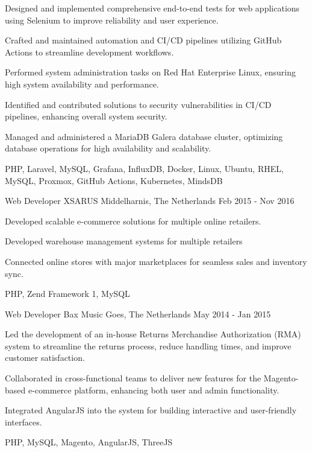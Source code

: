 \begin{cventries}
{\begin{cvitems}
        \item {Designed and implemented comprehensive end-to-end tests for web applications using Selenium to improve reliability and user experience.}
        \item {Crafted and maintained automation and CI/CD pipelines utilizing GitHub Actions to streamline development workflows.}
        \item {Performed system administration tasks on Red Hat Enterprise Linux, ensuring high system availability and performance.}
        \item {Identified and contributed solutions to security vulnerabilities in CI/CD pipelines, enhancing overall system security.}
        \item {Managed and administered a MariaDB Galera database cluster, optimizing database operations for high availability and scalability.}
      \end{cvitems}
    }
    {PHP, Laravel, MySQL, Grafana, InfluxDB, Docker, Linux, Ubuntu, RHEL, MySQL, Proxmox, GitHub Actions, Kubernetes, MindsDB}

\newpage

  \cventry
    {Web Developer} %
    {XSARUS} %
    {Middelharnis, The Netherlands} %
    {Feb 2015 - Nov 2016} %
    {
      \begin{cvitems} %
        \item {Developed scalable e-commerce solutions for multiple online retailers.}
        \item {Developed warehouse management systems for multiple retailers}
        \item {Connected online stores with major marketplaces for seamless sales and inventory sync.}
      \end{cvitems}
    }
    {PHP, Zend Framework 1, MySQL}

  \cventry
    {Web Developer} %
    {Bax Music} %
    {Goes, The Netherlands} %
    {May 2014 - Jan 2015} %
    {
      \begin{cvitems} %
        \item {Led the development of an in-house Returns Merchandise Authorization (RMA) system to streamline the returns process, reduce handling times, and improve customer satisfaction.}
        \item {Collaborated in cross-functional teams to deliver new features for the Magento-based e-commerce platform, enhancing both user and admin functionality.}
        \item {Integrated AngularJS into the system for building interactive and user-friendly interfaces.}
      \end{cvitems}
    }
    {PHP, MySQL, Magento, AngularJS, ThreeJS}


\end{cventries}
